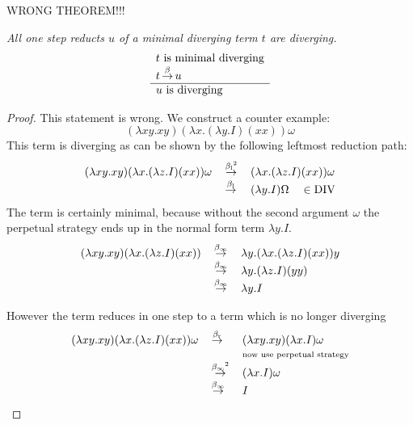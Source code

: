 \begin{theorem}
    WRONG THEOREM!!!

    \emph{All one step reducts $u$ of a minimal diverging term $t$ are
    diverging.}
    $$
    \begin{array}{l} 
        t \text{ is minimal diverging}
        \\
        t {\,\stackrel{\beta}{\to}\,} u
     \\ \hline 
        u \text{ is diverging}
    \end{array}
    $$


    \begin{proof}
        This statement is wrong. We construct a counter example:
        $$
        (\lambda x y. x y) (\lambda x. (\lambda y. I) (x x)) \omega
        $$
        This term is diverging as can be shown by the following leftmost
        reduction path:
        $$
        \begin{array}{lll}
            (\lambda x y. x y) (\lambda x. (\lambda z. I) (x x)) \omega
            &{\,\stackrel{{\beta_{\text{l}}}^2}{\to}\,}&
            (\lambda x. (\lambda z. I) (x x)) \omega
            \\
            &{\,\stackrel{{\beta_{\text{l}}}}{\to}\,}&
            (\lambda y. I) \Omega \quad \in {\text{DIV}}
        \end{array}
        $$
        The term is certainly minimal, because without the second argument
        $\omega$ the perpetual strategy ends up in the normal form term $\lambda
        y. I$.
        $$
        \begin{array}{lll}
            (\lambda x y. x y) (\lambda x. (\lambda z. I) (x x))
            &{\,\stackrel{{\beta_{\infty}}}{\to}\,}&
            \lambda y. (\lambda x. (\lambda z. I) (x x)) y
            \\
            &{\,\stackrel{{\beta_{\infty}}}{\to}\,}& \lambda y. (\lambda z. I) (y y)
            \\
            &{\,\stackrel{{\beta_{\infty}}}{\to}\,}& \lambda y. I
        \end{array}
        $$

        However the term reduces in one step to a term which is no longer
        diverging
        $$
        \begin{array}{lll}
            (\lambda x y. x y) (\lambda x. (\lambda z. I) (x x)) \omega
            &{\,\stackrel{{\beta_{\text{r}}}}{\to}\,}&
            (\lambda x y. x y) (\lambda x. I) \omega
            \\
            & & \text{\scriptsize now use perpetual strategy}
            \\
            &{\,\stackrel{{\beta_{\infty}}^2}{\to}\,}&
            (\lambda x. I) \omega
            \\
            &{\,\stackrel{{\beta_{\infty}}}{\to}\,}&
            I
        \end{array}
        $$
    \end{proof}
\end{theorem}
